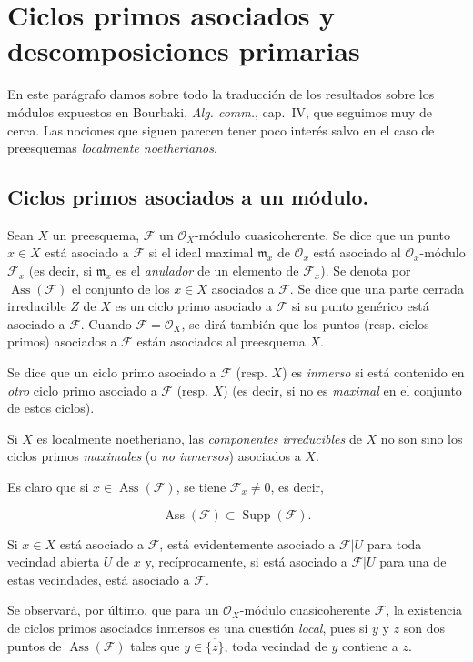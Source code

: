 \section{Ciclos primos asociados y descomposiciones primarias}

En este parágrafo damos sobre todo la traducción de los resultados sobre los
módulos expuestos en Bourbaki, \emph{Alg. comm.}, cap.~IV, que seguimos muy de
cerca. Las nociones que siguen parecen tener poco interés salvo en el caso de
preesquemas \emph{localmente noetherianos}.

\subsection{Ciclos primos asociados a un módulo.}

\begin{definition}[3.1.1]
\label{IV.2.3.1.1-def-fr}
Sean $X$ un preesquema, $\mathcal F$ un $\mathcal O_X$-módulo
cuasicoherente. Se dice que un punto $x\in X$ está asociado a $\mathcal F$ si
el ideal maximal $\mathfrak m_x$ de $\mathcal O_x$ está asociado al
$\mathcal O_x$-módulo $\mathcal F_x$ \textup{(es decir, si $\mathfrak m_x$ es el
\emph{anulador} de un elemento de $\mathcal F_x$)}. Se denota por
$\operatorname{Ass}(\mathcal F)$ el conjunto de los $x\in X$ asociados a
$\mathcal F$. Se dice que una parte cerrada irreducible $Z$ de $X$ es un
ciclo primo asociado a $\mathcal F$ si su punto genérico está
asociado a $\mathcal F$. Cuando $\mathcal F=\mathcal O_X$, se dirá también que
los puntos \textup{(resp.} ciclos primos) asociados a $\mathcal F$ están
asociados al preesquema $X$.
\end{definition}

Se dice que un ciclo primo asociado a $\mathcal F$ (resp. $X$) es
\emph{inmerso} si está contenido en \emph{otro} ciclo primo asociado a
$\mathcal F$ (resp. $X$) (es decir, si no es \emph{maximal} en el conjunto de
estos ciclos).

Si $X$ es localmente noetheriano, las \emph{componentes irreducibles} de $X$
no son sino los ciclos primos \emph{maximales} (o \emph{no inmersos})
asociados a $X$.

Es claro que si $x\in\operatorname{Ass}(\mathcal F)$, se tiene
$\mathcal F_x\ne0$, es decir,

\begin{env}[3.1.1.1]
\label{IV.2.3.1.1.1-fr}
\[
\operatorname{Ass}(\mathcal F)\subset\operatorname{Supp}(\mathcal F).
\]
\end{env}

Si $x\in X$ está asociado a $\mathcal F$, está evidentemente asociado a
$\mathcal F|U$ para toda vecindad abierta $U$ de $x$ y, recíprocamente, si está
asociado a $\mathcal F|U$ para una de estas vecindades, está asociado a
$\mathcal F$.

Se observará, por último, que para un $\mathcal O_X$-módulo cuasicoherente
$\mathcal F$, la existencia de ciclos primos asociados inmersos es una cuestión
\emph{local}, pues si $y$ y $z$ son dos puntos de
$\operatorname{Ass}(\mathcal F)$ tales que $y\in\overline{\{z\}}$, toda vecindad
de $y$ contiene a $z$.

